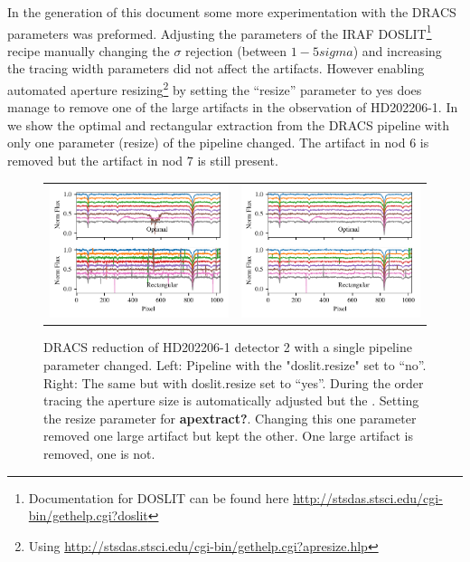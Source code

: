 In the generation of this document some more experimentation with the DRACS parameters was preformed. Adjusting the parameters of the IRAF DOSLIT\footnote{Documentation for DOSLIT can be found here \href{http://stsdas.stsci.edu/cgi-bin/gethelp.cgi?doslit}{http://stsdas.stsci.edu/cgi-bin/gethelp.cgi?doslit}} recipe
manually changing the \(\sigma\) rejection (between \(1-5 sigma\)) and increasing the tracing width parameters did not affect the artifacts. However enabling automated aperture resizing\footnote{Using \href{apresize}{http://stsdas.stsci.edu/cgi-bin/gethelp.cgi?apresize.hlp}} by setting the ``resize'' parameter to yes does manage to remove one of the large artifacts in the observation of {HD202206-1}. In  we show the optimal and rectangular extraction from the DRACS pipeline with only one parameter (resize) of the pipeline changed. The artifact in nod 6 is removed but the artifact in nod 7 is still present. 
\begin{figure}
    \centering
    \begin{tabular}{cc}
    \includegraphics[width=0.5\linewidth]{figures/reduction/bp_plots/non_resized_nods_HD202206-1_chip_2} & \includegraphics[width=0.5\linewidth]{figures/reduction/bp_plots/resized_nods_HD202206-1_chip_2}\\
    \end{tabular}
    \caption{DRACS reduction of HD202206-1 detector 2 with a single pipeline parameter changed. Left: Pipeline with the "doslit.resize" set to ``no''. Right: The same but with doslit.resize set to ``yes''. During the order tracing the aperture size is automatically adjusted but the . Setting the resize parameter for \textbf{apextract?}. Changing this one parameter removed one large artifact but kept the other. One large artifact is removed, one is not.}
    \label{fig:resizednods}
\end{figure}

